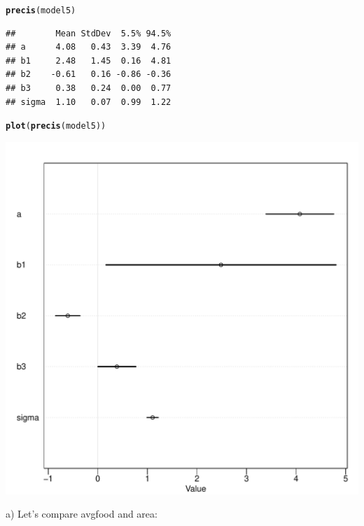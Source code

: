 \documentclass[12pt]{article}\usepackage[]{graphicx}\usepackage[]{color}
\makeatletter
\def\maxwidth{ %
  \ifdim\Gin@nat@width>\linewidth
    \linewidth
  \else
    \Gin@nat@width
  \fi
}
\newcommand{\hlstd}[1]{\textcolor[rgb]{0.345,0.345,0.345}{#1}}%
\newcommand{\hlkwd}[1]{\textcolor[rgb]{0.737,0.353,0.396}{\textbf{#1}}}%
\newenvironment{kframe}{%
 \def\at@end@of@kframe{}%
 \ifinner\ifhmode%
  \def\at@end@of@kframe{\end{minipage}}%
  \begin{minipage}{\columnwidth}%
 \fi\fi%
 \def\FrameCommand##1{\hskip\@totalleftmargin \hskip-\fboxsep
 \colorbox{shadecolor}{##1}\hskip-\fboxsep
     \hskip-\linewidth \hskip-\@totalleftmargin \hskip\columnwidth}%
 \MakeFramed {\advance\hsize-\width
   \@totalleftmargin\z@ \linewidth\hsize
   \@setminipage}}%
 {\par\unskip\endMakeFramed%
 \at@end@of@kframe}
\newenvironment{knitrout}{}{} %
\makeatother
\begin{document}
\begin{knitrout}
\begin{kframe}
\begin{alltt}
\hlkwd{precis}\hlstd{(model5)}
\end{alltt}
\begin{verbatim}
##        Mean StdDev  5.5% 94.5%
## a      4.08   0.43  3.39  4.76
## b1     2.48   1.45  0.16  4.81
## b2    -0.61   0.16 -0.86 -0.36
## b3     0.38   0.24  0.00  0.77
## sigma  1.10   0.07  0.99  1.22
\end{verbatim}
\begin{alltt}
\hlkwd{plot}\hlstd{(}\hlkwd{precis}\hlstd{(model5))}
\end{alltt}
\end{kframe}
\includegraphics[width=\maxwidth]{figure/unnamed-chunk-7-2} 

\end{knitrout}

a) Let's compare avgfood and area:
\end{document}
